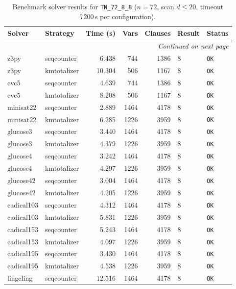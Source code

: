 \begin{longtable}{llrrrl p{}}
\caption{Benchmark solver results for \texttt{TN\_72\_8\_8} ($n=72$, scan $d \leq 20$, timeout 7200\,s per configuration).} \label{tab:bench-TN_72_8_8} \\
\toprule
Solver & Strategy & Time (s) & Vars & Clauses & Result & Status \\
\midrule
\endhead
\midrule
\multicolumn{7}{r}{\textit{Continued on next page}} \\
\midrule
\endfoot
\bottomrule
\endlastfoot
z3py & seqcounter & 6.438 & 744 & 1386 & 8 & \texttt{OK} \\
z3py & kmtotalizer & 10.304 & 506 & 1167 & 8 & \texttt{OK} \\
cvc5 & seqcounter & 4.639 & 744 & 1386 & 8 & \texttt{OK} \\
cvc5 & kmtotalizer & 8.208 & 506 & 1167 & 8 & \texttt{OK} \\
minisat22 & seqcounter & 2.889 & 1464 & 4178 & 8 & \texttt{OK} \\
minisat22 & kmtotalizer & 6.285 & 1226 & 3959 & 8 & \texttt{OK} \\
glucose3 & seqcounter & 3.440 & 1464 & 4178 & 8 & \texttt{OK} \\
glucose3 & kmtotalizer & 4.379 & 1226 & 3959 & 8 & \texttt{OK} \\
glucose4 & seqcounter & 3.242 & 1464 & 4178 & 8 & \texttt{OK} \\
glucose4 & kmtotalizer & 4.297 & 1226 & 3959 & 8 & \texttt{OK} \\
glucose42 & seqcounter & 3.004 & 1464 & 4178 & 8 & \texttt{OK} \\
glucose42 & kmtotalizer & 4.205 & 1226 & 3959 & 8 & \texttt{OK} \\
cadical103 & seqcounter & 4.312 & 1464 & 4178 & 8 & \texttt{OK} \\
cadical103 & kmtotalizer & 5.831 & 1226 & 3959 & 8 & \texttt{OK} \\
cadical153 & seqcounter & 5.243 & 1464 & 4178 & 8 & \texttt{OK} \\
cadical153 & kmtotalizer & 4.097 & 1226 & 3959 & 8 & \texttt{OK} \\
cadical195 & seqcounter & 3.430 & 1464 & 4178 & 8 & \texttt{OK} \\
cadical195 & kmtotalizer & 4.538 & 1226 & 3959 & 8 & \texttt{OK} \\
lingeling & seqcounter & 12.516 & 1464 & 4178 & 8 & \texttt{OK} \\

\end{longtable}
